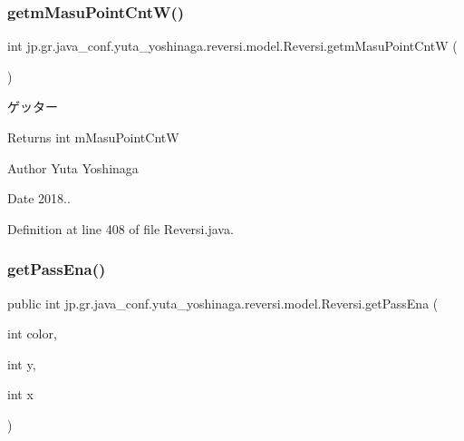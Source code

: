 \subsubsection{\texorpdfstring{getm\+Masu\+Point\+Cnt\+W()}{getmMasuPointCntW()}}
{\footnotesize\ttfamily int jp.\+gr.\+java\+\_\+conf.\+yuta\+\_\+yoshinaga.\+reversi.\+model.\+Reversi.\+getm\+Masu\+Point\+CntW (\begin{DoxyParamCaption}{ }\end{DoxyParamCaption})}



ゲッター 

\begin{DoxyReturn}{Returns}
int m\+Masu\+Point\+CntW 
\end{DoxyReturn}
\begin{DoxyAuthor}{Author}
Yuta Yoshinaga 
\end{DoxyAuthor}
\begin{DoxyDate}{Date}
2018.. 
\end{DoxyDate}


Definition at line 408 of file Reversi.\+java.

\mbox{\label{classjp_1_1gr_1_1java__conf_1_1yuta__yoshinaga_1_1reversi_1_1model_1_1_reversi_aecdacb362bc174ee98b1013789461310}} 
\subsubsection{\texorpdfstring{get\+Pass\+Ena()}{getPassEna()}}
{\footnotesize\ttfamily public int jp.\+gr.\+java\+\_\+conf.\+yuta\+\_\+yoshinaga.\+reversi.\+model.\+Reversi.\+get\+Pass\+Ena (\begin{DoxyParamCaption}\item[{int}]{color,  }\item[{int}]{y,  }\item[{int}]{x }\end{DoxyParamCaption})}



